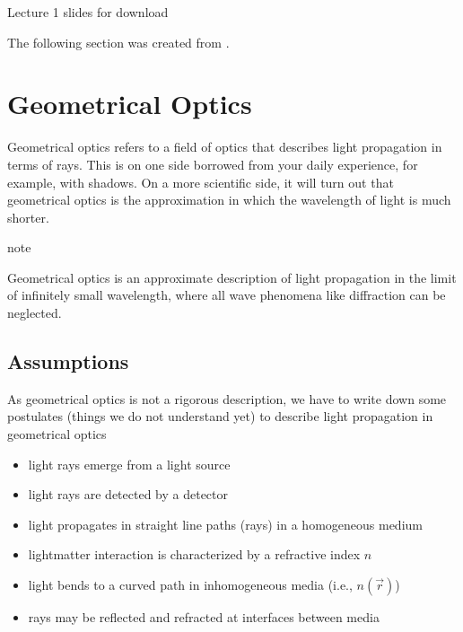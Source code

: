 \documentclass[letterpaper,10pt,english]{sphinxmanual}
\let\sphinxpxdimen\pdfpxdimen\else\newdimen\sphinxpxdimen
\begin{document}
\noindent\sphinxincludegraphics[width=600\sphinxpxdimen]{{slides}.png}

\sphinxAtStartPar
Lecture 1 slides for download 

\sphinxAtStartPar
The following section was created from .


\chapter{Geometrical Optics}
\label{\detokenize{notebooks/L1/Geometrical Optics:Geometrical-Optics}}\label{\detokenize{notebooks/L1/Geometrical Optics::doc}}
\sphinxAtStartPar
Geometrical optics refers to a field of optics that describes light propagation in terms of rays. This is on one side borrowed from your daily experience, for example, with shadows. On a more scientific side, it will turn out that geometrical optics is the approximation in which the wavelength of light is much shorter.

\begin{sphinxadmonition}{note}{}\unskip
\sphinxAtStartPar
{}

\sphinxAtStartPar
Geometrical optics is an approximate description of light propagation in the limit of infinitely small wavelength, where all wave phenomena like diffraction can be neglected.
\end{sphinxadmonition}


\section{Assumptions}
\label{\detokenize{notebooks/L1/Geometrical Optics:Assumptions}}
\sphinxAtStartPar
As geometrical optics is not a rigorous description, we have to write down some postulates (things we do not understand yet) to describe light propagation in geometrical optics
\begin{itemize}
\item {} 
\sphinxAtStartPar
light rays emerge from a light source

\item {} 
\sphinxAtStartPar
light rays are detected by a detector

\item {} 
\sphinxAtStartPar
light propagates in straight line paths (rays) in a homogeneous medium

\item {} 
\sphinxAtStartPar
light\textendash{}matter interaction is characterized by a refractive index \(n\)

\item {} 
\sphinxAtStartPar
light bends to a curved path in inhomogeneous media (i.e., \(n(\vec{r})\))

\item {} 
\sphinxAtStartPar
rays may be reflected and refracted at interfaces between media

\end{itemize}
\end{document}
